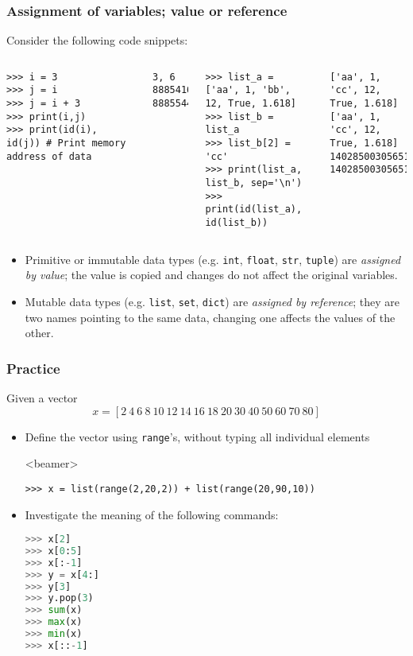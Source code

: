 \begin{frame}[fragile]
  \frametitle{Assignment of variables; value or reference}
  Consider the following code snippets:
  \begin{columns}[t]
    \begin{lstlisting}
>>> i = 3
>>> j = i 
>>> j = i + 3
>>> print(i,j)
>>> print(id(i), id(j)) # Print memory address of data
    \end{lstlisting}\pause
    \begin{lstlisting}[style=PyOutput]
3, 6
8885416 8885544
    \end{lstlisting}\pause
    \begin{lstlisting}
>>> list_a = ['aa', 1, 'bb', 12, True, 1.618]
>>> list_b = list_a
>>> list_b[2] = 'cc'
>>> print(list_a, list_b, sep='\n')
>>> print(id(list_a), id(list_b))
    \end{lstlisting}\pause
    \begin{lstlisting}[style=PyOutput]
['aa', 1, 'cc', 12, True, 1.618]
['aa', 1, 'cc', 12, True, 1.618]
140285003056512 140285003056512
    \end{lstlisting}\pause
  \end{columns}
  \begin{itemize}
    \item Primitive or immutable data types (e.g. \lstinline|int|, \lstinline|float|, \lstinline|str|, \lstinline|tuple|) are \emph{assigned by value}; the value is copied and changes do not affect the original variables.
    \item Mutable data types (e.g. \lstinline|list|, \lstinline|set|, \lstinline|dict|) are \emph{assigned by reference}; they are two names pointing to the same data, changing one affects the values of the other.
  \end{itemize}
\end{frame}


\begin{frame}[fragile,label=practice_lists]
  \frametitle{Practice}
  Given a vector 
  \[ 
     x = \left[2 \ 4 \ 6 \ 8 \ 10 \ 12 \ 14 \ 16 \ 18 \ 20 \ 30 \ 40 \ 50 \ 60 \ 70 \ 80 \right]
  \]
  \begin{itemize}
   \item Define the vector using \lstinline|range|'s, without typing all individual elements
   \pause
   \begin{onlyenv}<beamer> 
    \begin{lstlisting}[]
>>> x = list(range(2,20,2)) + list(range(20,90,10))
     \end{lstlisting}
     \pause
    \end{onlyenv}
   \item Investigate the meaning of the following commands:
   \begin{lstlisting}[language=Python, numbers=none]
>>> x[2]            
>>> x[0:5]          
>>> x[:-1]          
>>> y = x[4:]       
>>> y[3]            
>>> y.pop(3)      
>>> sum(x)    
>>> max(x)       
>>> min(x) 
>>> x[::-1]       
     \end{lstlisting}    
  \end{itemize}
 \end{frame}

